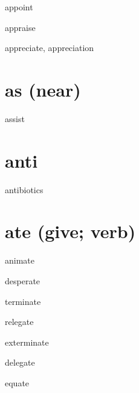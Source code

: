 \begin{RefWord}{appoint}
\end{RefWord}

\begin{RefWord}{appraise}
\end{RefWord}

\begin{RefWord}{appreciate, appreciation}
\end{RefWord}

\section{as (near)}

\begin{RefWord}{assist}
\end{RefWord}

\section{anti}

\begin{RefWord}{antibiotics}
\end{RefWord}

\section{ate (give; verb)}

\begin{RefWord}{animate}
\end{RefWord}

\begin{RefWord}{desperate}
\end{RefWord}

\begin{RefWord}{terminate}
\end{RefWord}

\begin{RefWord}{relegate}
\end{RefWord}

\begin{RefWord}{exterminate}
\end{RefWord}

\begin{RefWord}{delegate}
\end{RefWord}

\begin{RefWord}{equate}
\end{RefWord}

